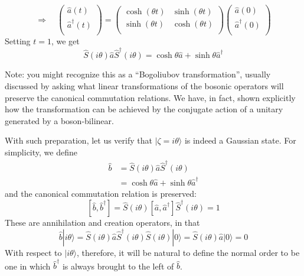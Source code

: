 \[ \Rightarrow \quad \left( \begin{array}{c}
	\hat{a}\left( t \right)\\
	\hat{a}^{\dagger}\left( t \right)\\
\end{array} \right) =\left( \begin{matrix}
	\cosh \left( \theta t \right)&		\sinh \left( \theta t \right)\\
	\sinh \left( \theta t \right)&		\cosh \left( \theta t \right)\\
\end{matrix} \right) \left( \begin{array}{c}
	\hat{a}\left( 0 \right)\\
	\hat{a}^{\dagger}\left( 0 \right)\\
\end{array} \right) \]
Setting $t=1$, we get
\[ \hat{S}\left( i\theta \right) \hat{a}\hat{S}^{\dagger}\left( i\theta \right) =\cosh \theta \hat{a}+\sinh \theta \hat{a}^{\dagger}\]

Note: you might recognize this as a ``Bogoliubov transformation'', usually discussed by asking what linear transformations of the bosonic operators will preserve the canonical commutation relations. We have, in fact, shown explicitly how the transformation can be achieved by the conjugate action of a unitary generated by a boson-bilinear.

With such preparation, let us verify that $|\zeta =i\theta \rangle$ is indeed a Gaussian state. For simplicity, we define
\begin{align*}
    \hat{b}&=\hat{S}\left( i\theta \right) \hat{a}\hat{S}^{\dagger}\left( i\theta \right) \\
    &=\cosh \theta \hat{a}+\sinh \theta \hat{a}^{\dagger}
\end{align*}
and the canonical commutation relation is preserved:
\[ \left[ \hat{b},\hat{b}^{\dagger} \right] =\hat{S}\left( i\theta \right) \left[ \hat{a},\hat{a}^{\dagger} \right] \hat{S}^{\dagger}\left( i\theta \right) =1\]
These are annihilation and creation operators, in that
\[ \hat{b}|i\theta \rangle =\hat{S}\left( i\theta \right) \hat{a}\hat{S}^{\dagger}\left( i\theta \right) \hat{S}\left( i\theta \right) |0\rangle =\hat{S}\left( i\theta \right) \hat{a}|0\rangle =0\]
With respect to $|i\theta \rangle$, therefore, it will be natural to define the normal order to be one in which $\hat{b}^\dagger$ is always brought to the left of $\hat{b}$.

